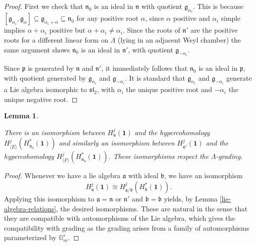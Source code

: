 \documentclass[11pt,letterpaper]{article}
\newtheorem{lemma}[theorem]{Lemma}
\theoremstyle{definition}
\theoremstyle{remark}
\numberwithin{equation}{section}
\theoremstyle{dotless}
\newcommand{\LieH}{H}
\begin{document}
\begin{proof} First we check that $\mathfrak n_0$ is an ideal in $\mathfrak n$ with quotient $\mathfrak g_{\alpha_i}$. This is because $[\mathfrak g_{\alpha_i}, \mathfrak g_{\alpha}] \subseteq \mathfrak g_{\alpha_i + \alpha} \subseteq \mathfrak n_0$ for any positive root $\alpha$, since $\alpha$ positive and $\alpha_i$ simple implies $\alpha+\alpha_i$ positive but $\alpha+\alpha_i \neq \alpha_i$. Since the roots of $\mathfrak n'$ are the positive roots for a different linear form on $\Lambda$ (lying in an adjacent Weyl chamber) the same argument shows $\mathfrak n_0$ is an ideal in $\mathfrak n'$, with quotient $\mathfrak g_{-\alpha_i}$.

Since $\mathfrak p$ is generated by $\mathfrak n$ and $\mathfrak n'$, it immediately follows that $\mathfrak n_0$ is an ideal in $\mathfrak p$, with quotient generated by $\mathfrak g_{\alpha_i}$ and $\mathfrak g_{-\alpha_i}$. It is standard that $\mathfrak g_{\alpha_i} $ and $\mathfrak g_{-\alpha_i}$ generate a Lie algebra isomorphic to $\mathfrak{sl}_2$, with $\alpha_i$ the unique positive root and $-\alpha_i$ the unique negative root.\end{proof} 

\begin{lemma}\label{hypercohomology-expression} 

There is an isomorphism between $\LieH^{j}_{\mathfrak n} ( \mathbf 1) $ and the hypercohomology $\LieH^j_ {\langle E \rangle} (  \LieH^*_{\mathfrak n_0} ( \mathbf 1 ))$ and similarly an isomorphism between $\LieH^{j}_{\mathfrak n'} ( \mathbf 1) $ and the hypercohomology $\LieH^j_{\langle F \rangle} (  \LieH^*_{\mathfrak n_0} ( \mathbf 1 ))$. These isomorphisms respect the $\Lambda$-grading.

\end{lemma}

\begin{proof} Whenever we have a lie algebra $\mathfrak a$ with ideal $\mathfrak b$, we have an isomorphism \[ \LieH^j_{\mathfrak a} ( \mathbf 1) \cong \LieH^j_{ \mathfrak a/\mathfrak b} (  \LieH^*_{\mathfrak b} (\mathbf 1)).\] Applying this isomorphism to $\mathfrak a= \mathfrak n$ or $\mathfrak n'$ and $\mathfrak b= \mathfrak b$ yields, by Lemma \ref{lie-algebra-relations}, the desired isomorphisms. These are natural in the sense that they are compatible with automorphisms of the Lie algebra, which gives the compatibility with grading as the grading arises from a family of automorphisms parameterized by $\mathbb G_m^{ r}$. \end{proof} 
\end{document}
